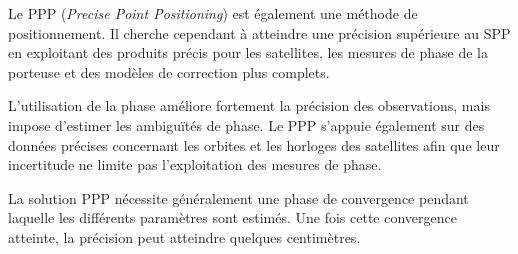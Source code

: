 Le PPP (\textit{Precise Point Positioning}) est également une méthode de
positionnement. Il
cherche cependant à atteindre une précision supérieure au SPP en exploitant
des produits précis pour les satellites, les mesures de phase de la porteuse
et des modèles de correction plus complets.

L'utilisation de la phase améliore fortement la précision des observations,
mais impose d'estimer les ambiguïtés de phase. Le PPP s'appuie
également sur des données précises concernant les orbites et les horloges des
satellites afin que leur incertitude ne limite pas l'exploitation des mesures
de phase.

La solution PPP nécessite généralement une phase de convergence pendant
laquelle les différents paramètres sont estimés. Une fois cette convergence
atteinte, la précision peut atteindre quelques centimètres.

